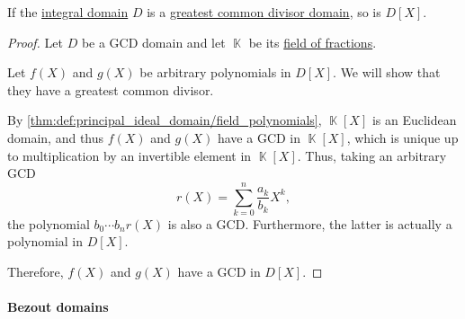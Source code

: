 \begin{proposition}\label{thm:polynomial_ring_over_gcd_domain}
  If the \hyperref[def:integral_domain]{integral domain} \( D \) is a \hyperref[def:gcd_domain]{greatest common divisor domain}, so is \( D[X] \).
\end{proposition}
\begin{proof}
  Let \( D \) be a GCD domain and let \( \BbbK \) be its \hyperref[def:field_of_fractions]{field of fractions}.

  Let \( f(X) \) and \( g(X) \) be arbitrary polynomials in \( D[X] \). We will show that they have a greatest common divisor.

  By \cref{thm:def:principal_ideal_domain/field_polynomials}, \( \BbbK[X] \) is an Euclidean domain, and thus \( f(X) \) and \( g(X) \) have a GCD in \( \BbbK[X] \), which is unique up to multiplication by an invertible element in \( \BbbK[X] \). Thus, taking an arbitrary GCD
  \begin{equation*}
    r(X) = \sum_{k=0}^n \frac {a_k} {b_k} X^k,
  \end{equation*}
  the polynomial \( b_0 \cdots b_n r(X) \) is also a GCD. Furthermore, the latter is actually a polynomial in \( D[X] \).

  Therefore, \( f(X) \) and \( g(X) \) have a GCD in \( D[X] \).
\end{proof}

\paragraph{Bezout domains}


